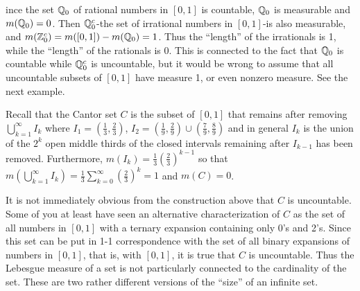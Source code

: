 \begin{ex}%
	ince the set $\mathbb{Q}_0$ of rational numbers in $[0,1]$ is countable, $\mathbb{Q}_0$ 
	is measurable and $m(\mathbb{Q}_0) = 0$. Then $\mathbb{Q}_0^c$-the set of irrational 
	numbers in $[0,1]$-is also measurable, and 
	$m(\mathbb{Z}_0^c) = m([0,1]) - m(\mathbb{Q}_0) = 1$. Thus the ``length'' of the 
	irrationals is 1, while the ``length'' of the rationals is 0. This is connected to the fact 
	that $\mathbb{Q}_0$ is countable while $\mathbb{Q}_0^c$ is uncountable, but it would 
	be wrong to assume that all uncountable subsets of $[0,1]$ have measure 1, or even 
	nonzero measure. See the next example. 
\end{ex}

\begin{ex}%
	Recall that the Cantor set $C$ is the subset of $[0,1]$ that remains after removing 
	$\bigcup\limits_{k=1}^\infty I_k$ where $I_1 = \left(\frac{1}{3},\frac{2}{3}\right)$, 
	$I_2 = \left(\frac{1}{9},\frac{2}{9}\right) \cup \left(\frac{7}{9},\frac{8}{9}\right)$ 
	and in general $I_k$ is the union of the $2^k$ open middle thirds of the closed intervals 
	remaining after $I_{k-1}$ has been removed. Furthermore, $m(I_k) = \frac{1}{3}\left(\frac{2}{3}\right)^{k-1}$ 
	so that $m\left(\bigcup\limits_{k=1}^\infty I_k\right) = \frac{1}{3}\sum\limits_{k=0}^\infty 
	\left(\frac{2}{3}\right)^k = 1$ and $m(C) = 0$. 
\end{ex}

\begin{rmk}%
	It is not immediately obvious from the construction above that $C$ is uncountable. 
	Some of you at least have seen an alternative characterization of $C$ as the set 
	of all numbers in $[0,1]$ with a ternary expansion containing only 0's and 2's. 
	Since this set can be put in 1-1 correspondence with the set of all binary expansions 
	of numbers in $[0,1]$, that is, with $[0,1]$, it is true that $C$ is uncountable. Thus 
	the Lebesgue measure of a set is not particularly connected to the cardinality of 
	the set. These are two rather different versions of the ``size'' of an infinite set. 
\end{rmk}

